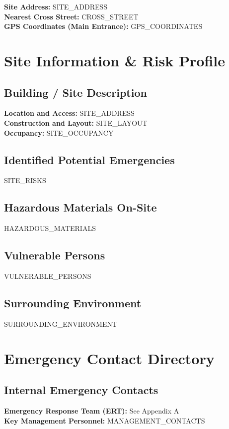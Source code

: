 \documentclass[11pt]{article}
\newcommand{\siteAddress}{{{SITE_ADDRESS}}}
\begin{document}
\textbf{Site Address:} \siteAddress \\
\textbf{Nearest Cross Street:} {{CROSS_STREET}} \\
\textbf{GPS Coordinates (Main Entrance):} {{GPS_COORDINATES}}

\section{Site Information \& Risk Profile}

\subsection{Building / Site Description}
\textbf{Location and Access:} \siteAddress \\
\textbf{Construction and Layout:} {{SITE_LAYOUT}} \\
\textbf{Occupancy:} {{SITE_OCCUPANCY}}

\subsection{Identified Potential Emergencies}
{{SITE_RISKS}}

\subsection{Hazardous Materials On-Site}
{{HAZARDOUS_MATERIALS}}

\subsection{Vulnerable Persons}
{{VULNERABLE_PERSONS}}

\subsection{Surrounding Environment}
{{SURROUNDING_ENVIRONMENT}}

\section{Emergency Contact Directory}

\subsection{Internal Emergency Contacts}
\textbf{Emergency Response Team (ERT):} See Appendix A \\
\textbf{Key Management Personnel:} {{MANAGEMENT_CONTACTS}}
\end{document}
